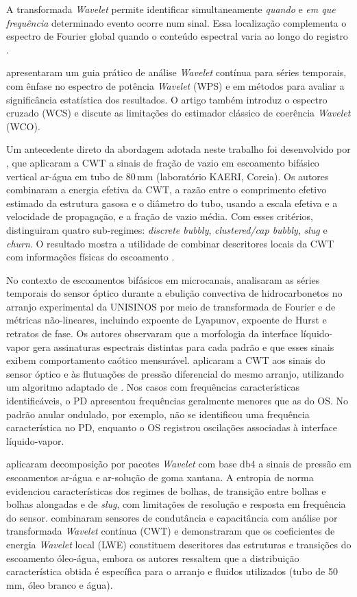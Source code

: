 A transformada \textit{Wavelet} permite identificar simultaneamente \textit{quando} e
\textit{em que frequência} determinado evento ocorre num sinal. Essa localização
complementa o espectro de Fourier global quando o conteúdo espectral varia ao longo
do registro
\cite{torrence1998}.

 apresentaram um guia prático de análise \textit{Wavelet} contínua
para séries temporais, com ênfase no espectro de potência \textit{Wavelet} (WPS) e em
métodos para avaliar a significância estatística dos resultados. O artigo também introduz
o espectro cruzado (WCS) e discute as limitações do estimador clássico de coerência
\textit{Wavelet} (WCO).

Um antecedente direto da abordagem adotada neste trabalho foi desenvolvido por
, que aplicaram a CWT a sinais de fração de vazio em escoamento
bifásico vertical ar-água em tubo de 80\,mm (laboratório KAERI, Coreia). Os autores
combinaram a energia efetiva da CWT, a razão entre o comprimento efetivo estimado
da estrutura gasosa e o diâmetro do tubo, usando a escala efetiva e a velocidade de propagação,
e a fração de vazio média.
Com esses critérios, distinguiram quatro sub-regimes: \textit{discrete bubbly},
\textit{clustered/cap bubbly}, \textit{slug} e \textit{churn}. O resultado
mostra a utilidade de combinar descritores locais da CWT com informações
físicas do escoamento \cite{nguyen2010}.

No contexto de escoamentos bifásicos em microcanais, 
analisaram as séries temporais do sensor óptico durante a ebulição convectiva de
hidrocarbonetos no arranjo experimental da UNISINOS por meio de transformada de Fourier e
de métricas não-lineares, incluindo expoente de Lyapunov, expoente de Hurst e retratos de
fase. Os autores observaram que a morfologia da interface líquido-vapor gera assinaturas
espectrais distintas para cada padrão e que esses sinais exibem comportamento caótico
mensurável.  aplicaram a CWT aos sinais do sensor óptico
e às flutuações de pressão diferencial do mesmo arranjo, utilizando um algoritmo
adaptado de .
Nos casos com frequências características identificáveis, o PD apresentou
frequências geralmente menores que as do OS. No padrão anular ondulado, por
exemplo, não se identificou uma frequência característica no PD, enquanto
o OS registrou oscilações associadas à interface líquido-vapor.

 aplicaram decomposição por pacotes \textit{Wavelet}
com base db4 a sinais de pressão em escoamentos ar-água e ar-solução de
goma xantana. A entropia de norma evidenciou características dos regimes de
bolhas, de transição entre bolhas e bolhas alongadas e de \textit{slug}, com
limitações de resolução e resposta em frequência do sensor.
 combinaram sensores de
condutância e capacitância com análise por transformada \textit{Wavelet} contínua (CWT) e
demonstraram que os coeficientes de energia \textit{Wavelet} local (LWE) constituem
descritores das estruturas e transições do escoamento óleo-água, embora os autores
ressaltem que a distribuição característica obtida é específica para o arranjo e fluidos
utilizados (tubo de 50\,mm, óleo branco e água).

